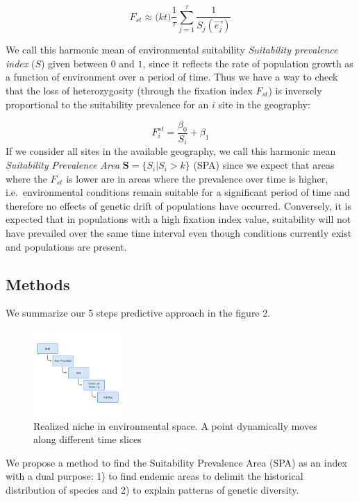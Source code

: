 \documentclass[
]{article}
\begin{document}
\[
F_{st} \approx \Big (kt\Big)  \frac{1}{\tau}\sum_{j=1}^{\tau}\frac{1}{S_j(\vec{e_j})}
\]

We call this harmonic mean of environmental suitability
\emph{Suitability prevalence index }(\(S\)) given between \(0\) and
\(1\), since it reflects the rate of population growth as a function of
environment over a period of time. Thus we have a way to check that the
loss of heterozygosity (through the fixation index \(F_{st}\)) is
inversely proportional to the suitability prevalence for an \(i\) site
in the geography:

\[
F_{i}^{st}= \frac{\beta_0}{S_i} + \beta_1
\] If we consider all sites in the available geography, we call this
harmonic mean \emph{Suitability Prevalence Area}
\(\mathbf{S} = \{S_i | S_i > k\}\) (SPA) since we expect that areas
where the \(F_{st}\) is lower are in areas where the prevalence over
time is higher, i.e.~environmental conditions remain suitable for a
significant period of time and therefore no effects of genetic drift of
populations have occurred. Conversely, it is expected that in
populations with a high fixation index value, suitability will not have
prevailed over the same time interval even though conditions currently
exist and populations are present.

\hypertarget{methods}{%
\subsection{Methods}\label{methods}}

We summarize our 5 steps predictive approach in the figure 2.

\begin{figure}
\centering
\includegraphics[width=0.3\textwidth,height=\textheight]{all_figures/figure_2.png}
\caption{Realized niche in environmental space. A point dynamically
moves along different time slices}
\end{figure}

We propose a method to find the Suitability Prevalence Area (SPA) as an
index with a dual purpose: 1) to find endemic areas to delimit the
historical distribution of species and 2) to explain patterns of genetic
diversity.
\end{document}
